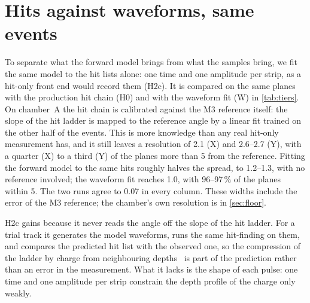 \section{Hits against waveforms, same events}\label{sec:tiers}

To separate what the forward model brings from what the samples bring, we fit the same model to the hit lists alone:
one time and one amplitude per strip, as a hit-only front end would record them (H2c). It is compared on the same
planes with the production hit chain (H0) and with the waveform fit (W) in \cref{tab:tiers}. On chamber~A the hit
chain is calibrated against the M3 reference itself: the slope of the hit ladder is mapped to the reference angle by a
linear fit trained on the other half of the events. This is more knowledge than any real hit-only measurement has, and
it still leaves a resolution of 2.1\textdegree{} (X) and 2.6--2.7\textdegree{} (Y), with a quarter (X) to a third (Y) of the
planes more than 5\textdegree{} from the reference. Fitting the forward model to the same hits roughly halves the
spread, to 1.2--1.3\textdegree, with no reference involved; the waveform fit reaches 1.0\textdegree, with 96--97\,\% of
the planes within 5\textdegree. The two runs agree to 0.07\textdegree{} in every column. These widths include the error
of the M3 reference; the chamber's own resolution is in \cref{sec:floor}.

H2c gains because it never reads the angle off the slope of the hit ladder. For a trial track it generates the
model waveforms, runs the same hit-finding on them, and compares the predicted hit list with the observed one, so the
compression of the ladder by charge from neighbouring depths~\cite{paperIIb} is part of the prediction rather than
an error in the measurement. What it lacks is the shape of each pulse: one time and one amplitude per strip
constrain the depth profile of the charge only weakly.

